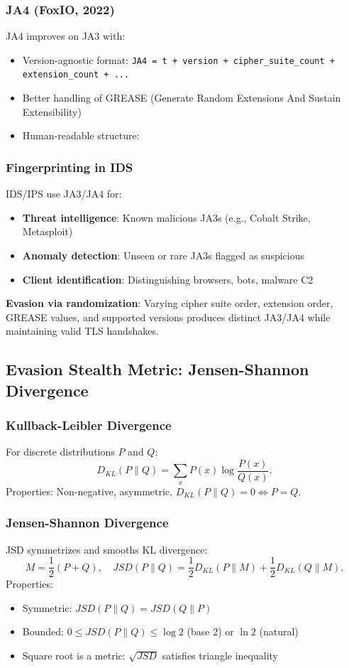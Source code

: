 \documentclass[review]{elsarticle}
\begin{document}
\subsubsection{JA4 (FoxIO, 2022)}
JA4 improves on JA3 with:
\begin{itemize}
\item Version-agnostic format: \texttt{JA4 = t + version + cipher\_suite\_count + extension\_count + ...}
\item Better handling of GREASE (Generate Random Extensions And Sustain Extensibility)
\item Human-readable structure: \texttt{}
\end{itemize}

\subsubsection{Fingerprinting in IDS}
IDS/IPS use JA3/JA4 for:
\begin{itemize}
\item \textbf{Threat intelligence}: Known malicious JA3s (e.g., Cobalt Strike, Metasploit)
\item \textbf{Anomaly detection}: Unseen or rare JA3s flagged as suspicious
\item \textbf{Client identification}: Distinguishing browsers, bots, malware C2
\end{itemize}
\textbf{Evasion via randomization}: Varying cipher suite order, extension order, GREASE values, and supported versions produces distinct JA3/JA4 while maintaining valid TLS handshakes.

\subsection{Evasion Stealth Metric: Jensen-Shannon Divergence}
\subsubsection{Kullback-Leibler Divergence}
For discrete distributions $P$ and $Q$:
\[
D_{KL}(P \parallel Q) = \sum_x P(x) \log \frac{P(x)}{Q(x)}.
\]
Properties: Non-negative, asymmetric, $D_{KL}(P \parallel Q) = 0 \iff P = Q$.

\subsubsection{Jensen-Shannon Divergence}
JSD symmetrizes and smooths KL divergence:
\[
M = \frac{1}{2}(P + Q), \quad JSD(P \parallel Q) = \frac{1}{2} D_{KL}(P \parallel M) + \frac{1}{2} D_{KL}(Q \parallel M).
\]
Properties:
\begin{itemize}
\item Symmetric: $JSD(P \parallel Q) = JSD(Q \parallel P)$
\item Bounded: $0 \leq JSD(P \parallel Q) \leq \log 2$ (base 2) or $\ln 2$ (natural)
\item Square root is a metric: $\sqrt{JSD}$ satisfies triangle inequality
\end{itemize}
\end{document}
